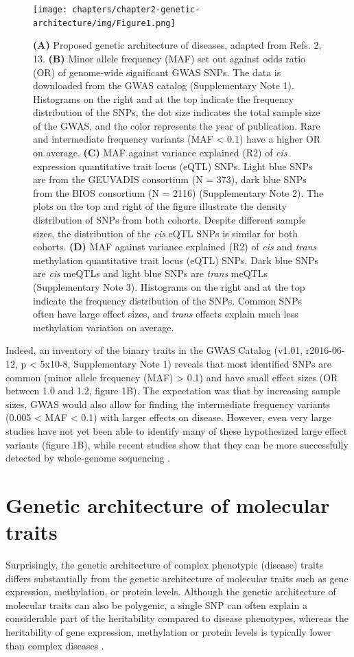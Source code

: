 \begin{figure}[h!]
	\texttt{[image: chapters/chapter2-genetic-architecture/img/Figure1.png]}
	\caption{\textbf{(A)} Proposed genetic architecture of diseases, adapted from Refs. 2, 13. \textbf{(B)} Minor allele frequency (MAF) set out against odds ratio (OR) of genome-wide significant GWAS SNPs. The data is downloaded from the GWAS catalog (Supplementary Note 1). Histograms on the right and at the top indicate the frequency distribution of the SNPs, the dot size indicates the total sample size of the GWAS, and the color represents the year of publication. Rare and intermediate frequency variants (MAF < 0.1) have a higher OR on average. \textbf{(C)} MAF against variance explained (R2) of \emph{cis} expression quantitative trait locus (eQTL) SNPs. Light blue SNPs are from the GEUVADIS consortium (N = 373), dark blue SNPs from the BIOS consortium (N = 2116) (Supplementary Note 2). The plots on the top and right of the figure illustrate the density distribution of SNPs from both cohorts. Despite different sample sizes, the distribution of the \emph{cis} eQTL SNPs is similar for both cohorts. \textbf{(D)} MAF against variance explained (R2) of \emph{cis} and \emph{trans} methylation quantitative trait locus (eQTL) SNPs. Dark blue SNPs are \emph{cis} meQTLs and light blue SNPs are \emph{trans} meQTLs (Supplementary Note 3). Histograms on the right and at the top indicate the frequency distribution of the SNPs. Common SNPs often have large effect sizes, and \emph{trans} effects explain much less methylation variation on average.}
\end{figure}

Indeed, an inventory of the binary traits in the GWAS Catalog (v1.01, r2016-06-12, p < 5x10-8, Supplementary Note 1) reveals that most identified SNPs are common (minor allele frequency (MAF) > 0.1) and have small effect sizes (OR between 1.0 and 1.2, figure 1B). The expectation was that by increasing sample sizes, GWAS would also allow for finding the intermediate frequency variants (0.005 < MAF < 0.1) with larger effects on disease. However, even very large studies have not yet been able to identify many of these hypothesized large effect variants \cite{fuchsbergerGeneticArchitectureType2016} (figure 1B), while recent studies show that they can be more successfully detected by whole-genome sequencing \cite{del-aguilaAlzheimerDiseaseRare2015,UK10KProjectIdentifies2015}.

\section{Genetic architecture of molecular traits}
Surprisingly, the genetic architecture of complex phenotypic (disease) traits differs substantially from the genetic architecture of molecular traits such as gene expression, methylation, or protein levels. Although the genetic architecture of molecular traits can also be polygenic, a single SNP can often explain a considerable part of the heritability compared to disease phenotypes, whereas the heritability of gene expression, methylation or protein levels is typically lower than complex diseases \cite{wrightHeritabilityGenomicsGene2014,poldermanMetaanalysisHeritabilityHuman2015}. 


